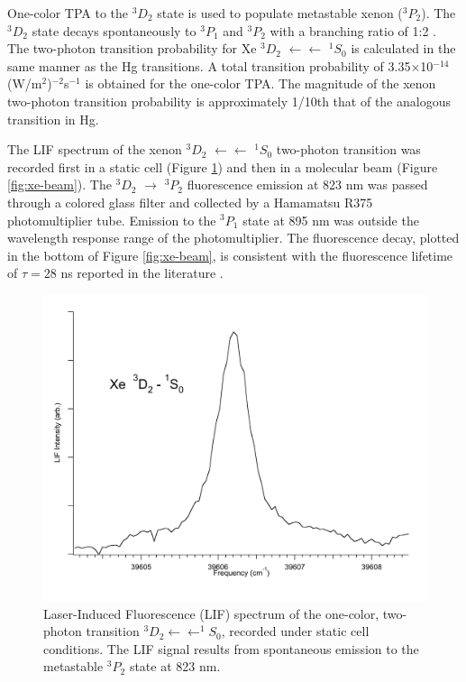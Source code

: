 One-color TPA to the $^3D_2$ state is used to populate metastable
xenon ($^3P_2$).  The $^3D_2$ state decays spontaneously to $^3P_1$
and $^3P_2$ with a branching ratio of 1:2 \cite{cabrera81}.  The
two-photon transition probability for Xe $^3D_2$ $\leftarrow
\leftarrow$ $^1S_0$ is calculated in the same manner as the Hg
transitions.  A total transition probability of 3.35$\times$10$^{-14}$
(W/m$^2$)$^{-2}$s$^{-1}$ is obtained for the one-color TPA.  The
magnitude of the xenon two-photon transition probability is
approximately 1/10th that of the analogous transition in Hg.

The LIF spectrum of the xenon $^3D_2$ $\leftarrow \leftarrow$ $^1S_0$
two-photon transition was recorded first in a static cell (Figure
\ref{fig:xe3d2-cell}) and then in a molecular beam (Figure
\ref{fig:xe-beam}).  The $^3D_2$ $\rightarrow$ $^3P_2$ fluorescence
emission at 823 nm was passed through a colored glass filter and
collected by a Hamamatsu R375 photomultiplier tube.  Emission to the
$^3P_1$ state at 895 nm was outside the wavelength response range of
the photomultiplier.  The fluorescence decay, plotted in the bottom of
Figure \ref{fig:xe-beam}, is consistent with the fluorescence lifetime
of $\tau = 28$ ns reported in the literature \cite{cabrera81}.

\begin{figure}
  \caption{Laser-Induced Fluorescence (LIF) spectrum of the one-color,
    two-photon transition  $^3D_2 \leftarrow \leftarrow
    ^1S_0$, recorded under static cell conditions.  The LIF signal
    results from spontaneous emission to the metastable $^3P_2$
    state at 823 nm.}
  \label{fig:xe3d2-cell}
  \centering
  \vspace{1cm}
  \includegraphics[width=6in]{Xe3D2-cell.pdf}
  \vspace{3cm}
\end{figure}

